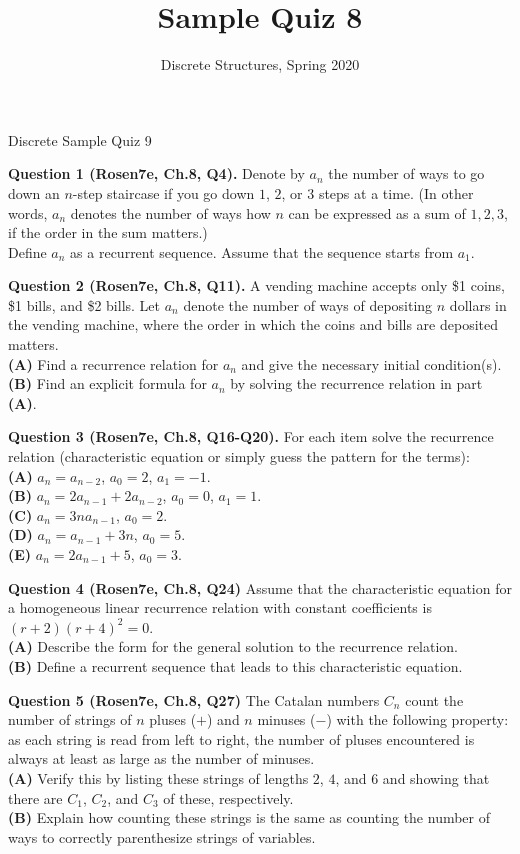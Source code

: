 \documentclass[jou]{apa6}
\title{Sample Quiz 8}
\author{Discrete Structures, Spring 2020}
\affiliation{RBS}
\begin{document}
\thispagestyle{empty}

\twocolumn
{\Large Discrete Sample Quiz 9}

\vspace{10pt}
{\bf Question 1 (Rosen7e, Ch.8, Q4).} 
Denote by $a_n$ the number of ways to go down an $n$-step staircase if you go down $1$, $2$, or $3$ steps at a time.
(In other words, $a_n$ denotes the number of ways how $n$ can be expressed as a sum of $1,2,3$, if the
order in the sum matters.)\\
Define $a_n$ as a recurrent sequence. Assume that the sequence starts from $a_1$. 

\vspace{10pt}
{\bf Question 2 (Rosen7e, Ch.8, Q11).}
A vending machine accepts only \$1 coins, \$1 bills, and \$2 bills. Let $a_n$ denote the
number of ways of depositing $n$ dollars in the vending machine, where the order in which the coins and bills
are deposited matters.\\
{\bf (A)} Find a recurrence relation for $a_n$ and give the necessary initial condition(s).\\
{\bf (B)} Find an explicit formula for $a_n$ by solving the recurrence relation in part {\bf (A)}.

\vspace{10pt}
{\bf Question 3 (Rosen7e, Ch.8, Q16-Q20).}
For each item solve the recurrence relation (characteristic equation 
or simply guess the pattern for the terms):\\
{\bf (A)} $a_n = a_{n-2}$, $a_0 = 2$, $a_1 = -1$.\\
{\bf (B)} $a_n = 2a_{n-1} + 2a_{n-2}$, $a_0 = 0$, $a_1 = 1$.\\
{\bf (C)} $a_n = 3na_{n-1}$, $a_0 = 2$.\\
{\bf (D)} $a_n = a_{n-1} + 3n$, $a_0 = 5$.\\
{\bf (E)} $a_n = 2a_{n-1} + 5$, $a_0 = 3$.

\vspace{10pt}
{\bf Question 4 (Rosen7e, Ch.8, Q24)}
Assume that the characteristic equation for a homogeneous 
linear recurrence relation with constant coefficients
is $(r + 2)(r + 4)^2 = 0$.\\
{\bf (A)} Describe the form for the general solution to the recurrence relation.\\
{\bf (B)} Define a recurrent sequence that leads to this characteristic equation.


\vspace{10pt}
{\bf Question 5 (Rosen7e, Ch.8, Q27)} 
The Catalan numbers $C_n$ count the number of strings of $n$ pluses ($+$) and $n$ minuses ($-$)
with the following property: as each
string is read from left to right, the number of pluses encountered is always 
at least as large as the number of minuses.\\
{\bf (A)} Verify this by listing these strings of lengths $2$, 
$4$, and $6$ and showing that there are $C_1$, $C_2$, and $C_3$ of
these, respectively.\\
{\bf (B)} Explain how counting these strings is the same as counting 
the number of ways to correctly parenthesize strings of variables.
\end{document}
